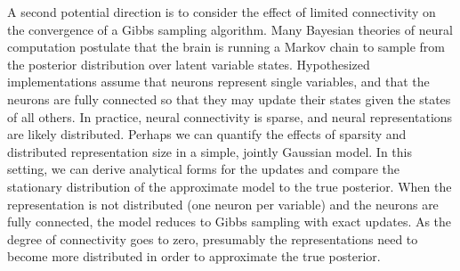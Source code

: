 A second potential direction is to consider the effect of 
limited connectivity on the convergence of a Gibbs sampling 
algorithm. Many Bayesian theories of neural computation 
postulate that the brain is running a Markov chain to sample 
from the posterior distribution over latent variable states. 
Hypothesized implementations assume that neurons represent 
single variables, and that the neurons are fully 
connected so that they may update their states given the states 
of all others. In practice, neural connectivity is sparse, 
and neural representations are likely distributed. Perhaps we 
can quantify the effects of sparsity and distributed 
representation size in a simple, jointly Gaussian model. 
In this setting, we can derive analytical forms for the 
updates and compare the stationary distribution of the 
approximate model to the true posterior. When the representation 
is not distributed (one neuron per variable) and the 
neurons are fully connected, the model reduces to Gibbs sampling 
with exact updates. As the degree of connectivity goes 
to zero, presumably the representations need to become more 
distributed in order to approximate the true posterior. 

